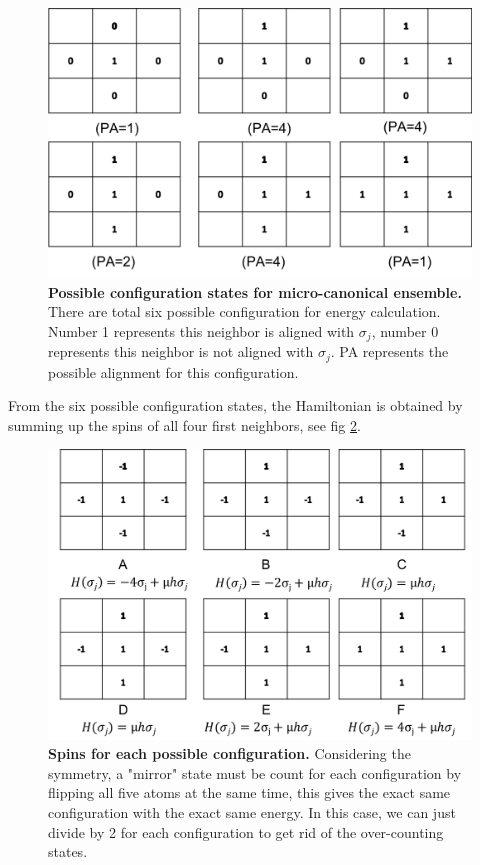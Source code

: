 \documentclass{llncs}
\begin{document}
\begin{figure}
	\includegraphics[width=\linewidth]{images/configuration.png}
	\caption{\textbf{Possible configuration states for micro-canonical ensemble.} There are total six possible configuration for energy calculation. Number 1 represents this neighbor is aligned with $\sigma_j$, number 0 represents this neighbor is not aligned with $\sigma_j$. PA represents the possible alignment for this configuration.}
	\label{fig:configuration}
\end{figure}
From the six possible configuration states, the Hamiltonian is obtained by summing up the spins of all four first neighbors, see fig \ref{fig:spins}. 
\begin{figure}
	\includegraphics[width=\linewidth]{images/spins.png}
	\caption{\textbf{Spins for each possible configuration.} Considering the symmetry, a "mirror" state must be count for each configuration by flipping all five atoms at the same time, this gives the exact same configuration with the exact same energy. In this case, we can just divide by 2 for each configuration to get rid of the over-counting states.}
	\label{fig:spins}
\end{figure}
\end{document}
